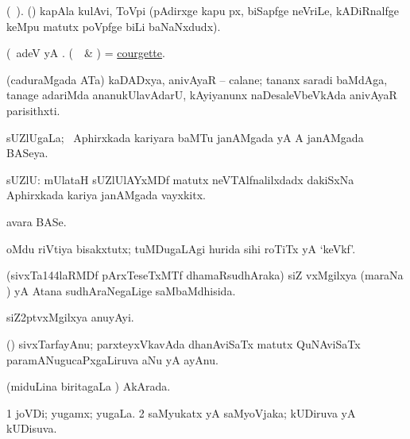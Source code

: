\bentry
{} 
\gl{\nA} 
\bmng
(\bava\ ). 
(\roVkAyx)   kapAla kulAvi, ToVpi (pAdirxge kapu px, biSapfge neVriLe, kADiRnalfge keMpu matutx poVpfge biLi baNaNxdudx).  
\emng
\eentry

\bentry
{} 
\gl{\nA} 
\bmng
(\bava\ adeV yA . 
(\kanmu\  \ame\ \& \AseTxrXV)  = \hyperref{kandict_c.pdf}{C}{courgette}{courgette}.
\emng
\eentry

\bentry
{} 
\gl{\nA} 
\bmng
(caduraMgada ATa) kaDADxya, anivAyaR -- calane; tananx saradi baMdAga,  tanage adariMda ananukUlavAdarU, kAyiyanunx naDesaleVbeVkAda anivAyaR parisithxti.
\emng
\eentry

\bentry
{} 
\gl{\gu} 
\bmng
sUZlUgaLa; \da\ Aphirxkada kariyara baMTu janAMgada yA A janAMgada BASeya.
\emng
\eentry

\bentry
{} 
\gl{\nA} 
\bmng
sUZlU: 
\banum
{} mUlataH sUZlUlAYxMDf matutx neVTAlfnalilxdadx dakiSxNa Aphirxkada kariya janAMgada vayxkitx. 

 avara BASe.
\eanum
\emng
\eentry

\bentry
{} 
\gl{\nA} 
\bmng
oMdu riVtiya bisakxtutx; tuMDugaLAgi hurida sihi roTiTx yA `keVkf'.
\emng
\eentry

\bentry
{} 
\gl{\gu} 
\bmng
(sivxTa\char144laRMDf pArxTeseTxMTf dhamaRsudhAraka) siZ\kern2pt vxMgilxya  (maraNa ) yA Atana sudhAraNegaLige saMbaMdhisida.
\emng 
\eentry

\bentry
{}  
\gl{\nA} 
\bmng
siZ\kern2ptvxMgilxya anuyAyi.
\emng
\eentry

\bentry
{} 
\gl{\nA} 
\bmng
(\ravi) sivxTarfayAnu; parxteyxVkavAda dhanAviSaTx matutx QuNAviSaTx paramANugucaPxgaLiruva aNu yA ayAnu. 
\emng
\eentry

\bentry
{} 
\gl{\gu} 
\bmng
(miduLina biritagaLa \vi)  AkArada.
\emng
\eentry

\bentry
{} 
\gl{\sapUpa} 
\bmng
\bnum
\num{1} joVDi; yugamx; yugaLa. 
\num{2} saMyukatx yA saMyoVjaka; kUDiruva yA kUDisuva.
\enum
\emng
\eentry

